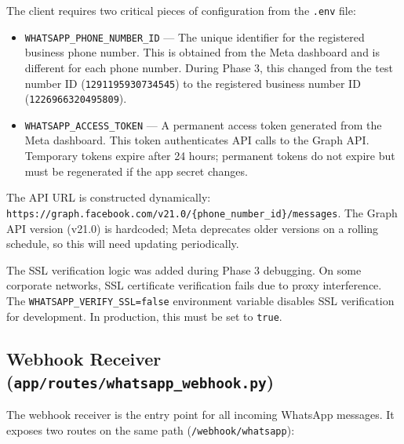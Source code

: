\documentclass[12pt, a4paper]{report}
\begin{document}
The client requires two critical pieces of configuration from the \texttt{.env} file:

\begin{itemize}[itemsep=3pt]
    \item \texttt{WHATSAPP\_PHONE\_NUMBER\_ID} --- The unique identifier for the registered business phone number. This is obtained from the Meta dashboard and is different for each phone number. During Phase 3, this changed from the test number ID (\texttt{1291195930734545}) to the registered business number ID (\texttt{1226966320495809}).
    \item \texttt{WHATSAPP\_ACCESS\_TOKEN} --- A permanent access token generated from the Meta dashboard. This token authenticates API calls to the Graph API. Temporary tokens expire after 24 hours; permanent tokens do not expire but must be regenerated if the app secret changes.
\end{itemize}

The API URL is constructed dynamically: \texttt{https://graph.facebook.com/v21.0/\{phone\_number\_id\}/messages}. The Graph API version (v21.0) is hardcoded; Meta deprecates older versions on a rolling schedule, so this will need updating periodically.

The SSL verification logic was added during Phase 3 debugging. On some corporate networks, SSL certificate verification fails due to proxy interference. The \texttt{WHATSAPP\_VERIFY\_SSL=false} environment variable disables SSL verification for development. In production, this must be set to \texttt{true}.

\subsection{Webhook Receiver (\texttt{app/routes/whatsapp\_webhook.py})}

The webhook receiver is the entry point for all incoming WhatsApp messages. It exposes two routes on the same path (\texttt{/webhook/whatsapp}):
\end{document}
